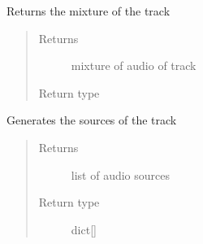 \documentclass[letterpaper,10pt,english,openany,oneside]{sphinxmanual}
\begin{document}
\begin{fulllineitems}
\begin{fulllineitems}
\begin{quote}
\begin{description}
\end{description}\end{quote}

\end{fulllineitems}


\begin{fulllineitems}
\label{\detokenize{docs/source/preprocess:preprocess.track_classes.Track.mixture}}
Returns the mixture of the track
\begin{quote}\begin{description}
\item[{Returns}] \leavevmode
{} \textendash{} mixture of audio of track

\item[{Return type}] \leavevmode
{\hyperref[\detokenize{docs/source/preprocess:preprocess.track_classes.Audio}]{}}

\end{description}\end{quote}

\end{fulllineitems}


\begin{fulllineitems}
\label{\detokenize{docs/source/preprocess:preprocess.track_classes.Track.sources}}
Generates the sources of the track
\begin{quote}\begin{description}
\item[{Returns}] \leavevmode
{} \textendash{} list of audio sources

\item[{Return type}] \leavevmode
dict{[}{\hyperref[\detokenize{docs/source/preprocess:preprocess.track_classes.Audio}]{}}{]}

\end{description}\end{quote}

\end{fulllineitems}


\end{fulllineitems}
\end{document}
